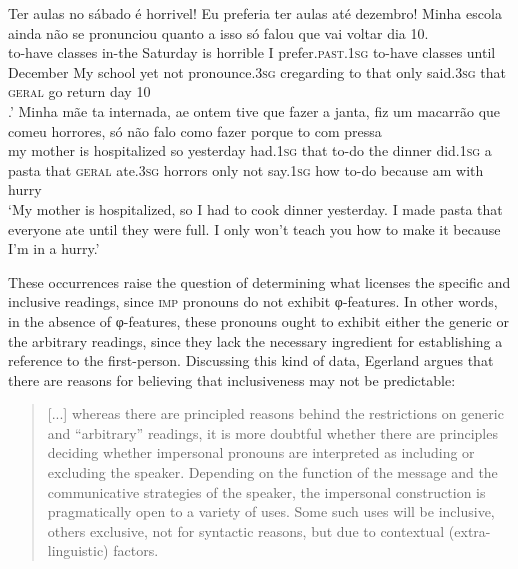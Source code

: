 \documentclass[output=paper]{langscibook}
\begin{document}
\ea\label{ex:avelar:36}
 \ea\label{ex:avelar:36a} 
  \gll Ter     aulas     no sábado     é horrivel!    Eu preferia ter       aulas     até dezembro!  Minha escola ainda não {se pronunciou}   quanto   a isso   só     falou que  vai  voltar   dia 10.\\ %
         to-have   classes    in-the Saturday   is horrible    I prefer.\textsc{past.1sg} to-have   classes    until December   My school   yet   not pronounce.\textsc{3sg} cregarding   to that  only   said.\textsc{3sg} that   \textsc{geral}   go   return day 10\\
  .’
 \ex\label{ex:avelar:36b} 
  \gll Minha mãe     ta internada,     ae  ontem     tive     que   fazer a janta,   fiz       um  macarrão  que  comeu   horrores, só     não   falo     como   fazer   porque   to   com pressa\\ %
         my   mother   is hospitalized   so   yesterday   had.\textsc{1sg}  that   to-do the dinner  did.\textsc{1sg} a   pasta     that   \textsc{geral}   ate.\textsc{3sg} horrors only   not   say.\textsc{1sg}  how   to-do   because   am  with hurry\\
 \glt ‘My mother is hospitalized, so I had to cook dinner yesterday. I made pasta that everyone ate until they were full. I only won’t teach you how to make it because I’m in a hurry.’
\z 
\z

These occurrences raise the question of determining what licenses the specific and inclusive readings, since \textsc{imp} pronouns do not exhibit φ-fea\-tures. In other words, in the absence of φ-fea\-tures, these pronouns ought to exhibit either the generic or the arbitrary readings, since they lack the necessary ingredient for establishing a reference to the first-person. Discussing this kind of data, Egerland argues that there are reasons for believing that inclusiveness may not be predictable:

\begin{quote}
    [...] whereas there are principled reasons behind the restrictions on generic and “arbitrary” readings, it is more doubtful whether there are principles deciding whether impersonal pronouns are interpreted as including or excluding the speaker. Depending on the function of the message and the communicative strategies of the speaker, the impersonal construction is pragmatically open to a variety of uses. Some such uses will be inclusive, others exclusive, not for syntactic reasons, but due to contextual (extra-linguistic) factors.\hfill\hbox{\citep[96--97]{Egerland2003}}
\end{quote}
\end{document}

